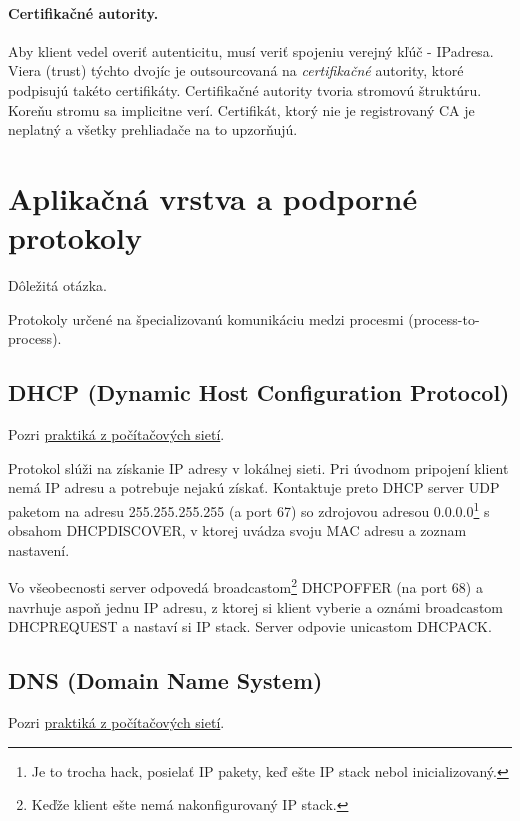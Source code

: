 \documentclass[10pt,a4paper]{article}
\begin{document}
\paragraph{Certifikačné autority.}
Aby klient vedel overiť autenticitu, musí veriť spojeniu verejný kľúč - IPadresa. 
Viera (trust) týchto dvojíc je outsourcovaná na \emph{certifikačné} autority,
ktoré podpisujú takéto certifikáty. Certifikačné autority tvoria stromovú štruktúru. Koreňu stromu sa implicitne verí. 
Certifikát, ktorý nie je registrovaný CA je neplatný a všetky prehliadače na to upzorňujú. 
            
\section{Aplikačná vrstva a podporné protokoly}     
Dôležitá otázka.   

Protokoly určené na špecializovanú komunikáciu medzi procesmi (process-to-process).  

\subsection{DHCP (Dynamic Host Configuration Protocol)} 
\label{DHCP}
Pozri \href{http://netlab.dcs.fmph.uniba.sk/siete/cviko4/}{praktiká z počítačových sietí}. 
  
Protokol slúži na získanie IP adresy v lokálnej sieti. 
Pri úvodnom pripojení klient nemá IP adresu a potrebuje nejakú získať. Kontaktuje preto DHCP server UDP paketom na adresu 255.255.255.255 (a port 67) so zdrojovou adresou 0.0.0.0\footnote{
Je to trocha hack, posielať IP pakety, keď ešte IP stack nebol inicializovaný.
} s obsahom DHCPDISCOVER, v ktorej uvádza svoju MAC adresu a zoznam nastavení. 

Vo všeobecnosti server odpovedá broadcastom\footnote{
Keďže klient ešte nemá nakonfigurovaný IP stack. 
} DHCPOFFER (na port 68) a navrhuje aspoň jednu IP adresu, z ktorej si klient vyberie a oznámi broadcastom DHCPREQUEST a nastaví si IP stack. Server odpovie unicastom DHCPACK.
  
\subsection{DNS (Domain Name System)}   
Pozri \href{http://netlab.dcs.fmph.uniba.sk/siete/cviko4/}{praktiká z počítačových sietí}. 
\end{document}
